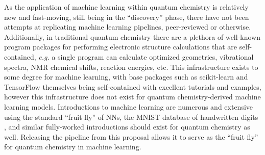 \documentclass[12pt]{article}
\begin{document}
As the application of machine learning within quantum chemistry is relatively new and fast-moving, still being in the ``discovery'' phase, there have not been attempts at replicating machine learning pipelines, peer-reviewed or otherwise. Additionally, in traditional quantum chemistry there are a plethora of well-known program packages for performing electronic structure calculations \cite{g16,QCHEM4,daltonpaper,WCMS:WCMS93} that are self-contained, \emph{e.g.} a single program can calculate optimized geometries, vibrational spectra, NMR chemical shifts, reaction energies, etc. This infrastructure exists to some degree for machine learning, with base packages such as scikit-learn \cite{scikit-learn} and TensorFlow \cite{tensorflow2015-whitepaper} themselves being self-contained with excellent tutorials and examples, however this infrastructure does not exist for quantum chemistry-derived machine learning models. Introductions to machine learning are numerous and extensive using the standard ``fruit fly'' of NNs, the MNIST database of handwritten digits \cite{lecun-01a}, and similar fully-worked introductions should exist for quantum chemistry as well. Releasing the pipeline from this proposal allows it to serve as the ``fruit fly'' for quantum chemistry in machine learning.

\printbibliography
\end{document}
